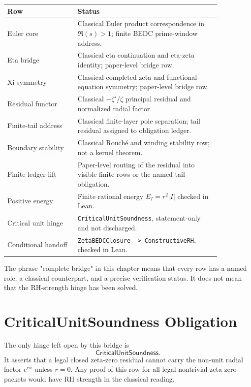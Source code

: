 \begin{center}
\begin{tabular}{p{0.28\linewidth}p{0.58\linewidth}}
\toprule
\textbf{Row} & \textbf{Status}\\
\midrule
Euler core & Classical Euler product correspondence in $\Re(s)>1$; finite BEDC prime-window address.\\
\addlinespace
Eta bridge & Classical eta continuation and eta-zeta identity; paper-level bridge row.\\
\addlinespace
Xi symmetry & Classical completed zeta and functional-equation symmetry; paper-level bridge row.\\
\addlinespace
Residual functor & Classical $-\zeta'/\zeta$ principal residual and normalized radial factor.\\
\addlinespace
Finite-tail address & Classical finite-layer pole separation; tail residual assigned to obligation ledger.\\
\addlinespace
Boundary stability & Classical Rouch\'e and winding stability row; not a kernel theorem.\\
\addlinespace
Finite ledger lift & Paper-level routing of the residual into visible finite rows or the named tail obligation.\\
\addlinespace
Positive energy & Finite rational energy $E_I=r^2|I|$ checked in Lean.\\
\addlinespace
Critical unit hinge & \texttt{CriticalUnitSoundness}, statement-only and not discharged.\\
\addlinespace
Conditional handoff & \texttt{ZetaBEDCClosure -> ConstructiveRH}, checked in Lean.\\
\bottomrule
\end{tabular}
\end{center}

The phrase "complete bridge" in this chapter means that every row has a
named role, a classical counterpart, and a precise verification status.
It does not mean that the RH-strength hinge has been solved.

\section{CriticalUnitSoundness Obligation}
\label{sec:rh-zeta-critical-unit-obligation}

\begin{principle}
\label{prin:rh-zeta-critical-unit-single-hinge}
The only hinge left open by this bridge is
$$
\mathsf{CriticalUnitSoundness}.
$$
It asserts that a legal closed zeta-zero residual cannot carry the
non-unit radial factor $e^{ru}$ unless $r=0$. Any proof of this row for
all legal nontrivial zeta-zero packets would have RH strength in the
classical reading.
\end{principle}

